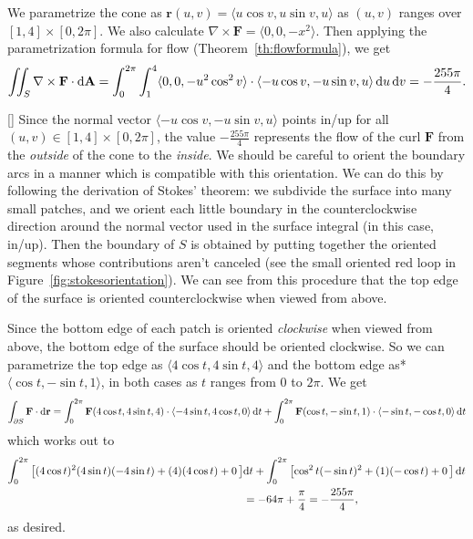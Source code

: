 \documentclass[prettycode,shellescape]{watsonbook}
\begin{document}
\begin{solution}
  We parametrize the cone as
  $\mathbf{r}(u,v) = \langle u\cos v, u\sin v, u \rangle$ as $(u,v)$
  ranges over $[1,4]\times [0,2\pi]$.  We also calculate
  $\nabla \times \mathbf{F} = \langle 0, 0, -x^2 \rangle$. Then applying
  the parametrization formula for flow (Theorem~\ref{th:flowformula}),
  we get 
  \[
    \iint_S \nabla \times \mathbf{F} \cdot \mathrm{d}\mathbf{A} =
    \int_{0}^{2\pi} \int_{1}^{4} \langle 0, 0, -u^2\cos^2 v \rangle \cdot
    \langle -u  \cos v, -u \sin v, u \rangle \, \mathrm{d} u\, \mathrm{d} v = -
    \frac{255\pi}{4}. 
  \]
  \begin{insetfigure}{\usebox{\asybox}}[]
Since the normal vector
    $\langle -u \cos v, -u \sin v, u \rangle$ points in/up for all
    $(u,v) \in [1,4]\times [0,2\pi]$, the value $- \frac{255\pi}{4}$
    represents the flow of the curl $\mathbf{F}$ from the
    \textit{outside} of the cone to the \textit{inside}. We should be
    careful to orient the boundary arcs in a manner which is
    compatible with this orientation. We can do this by following the
    derivation of Stokes' theorem: we subdivide the surface into many
    small patches, and we orient each little boundary in the
    counterclockwise direction around the normal vector used in the
    surface integral (in this case, in/up). Then the boundary of $S$
    is obtained by putting together the oriented segments whose
    contributions aren't canceled (see the small oriented red loop in
    Figure~\ref{fig:stokesorientation}). We can see from this
    procedure that the top edge of the surface is oriented
    counterclockwise when viewed from
    above. 
  \end{insetfigure}

  Since the bottom edge of each patch is oriented \textit{clockwise}
  when viewed from above, the bottom edge of the surface should be
  oriented clockwise. So we can parametrize the top edge as
  $\langle 4 \cos t, 4 \sin t, 4 \rangle$ and the bottom edge as*
   $\langle\cos t, - \sin t, 1\rangle$, in both
  cases as $t$ ranges from $0$ to $2\pi$. We get
  \[
    \int_{\partial S} \mathbf{F} \cdot \mathrm{d}{\mathbf{r}} =
    \int_{0}^{2\pi} \mathbf{F}(4\cos t, 4\sin t, 4) \cdot \langle
    -4\sin t, 4 \cos t, 0 \rangle \, \mathrm{d}{t} +
    \int_{0}^{2\pi} \mathbf{F}(\cos t, -\sin t, 1) \cdot \langle
    -\sin t, -\cos t, 0 \rangle \, \mathrm{d}{t}
  \]
  which works out to
  \begin{align*}
    \int_{0}^{2\pi} \left[(4\cos t)^2 (4\sin t)(-4\sin t) + (4)(4\cos t) +
    0 \, \right] &\mathrm{d} t  + \int_{0}^{2\pi}\left[ \cos^2 t (-\sin t)^2 + (1)(-\cos t) +
                   0\, \right]\mathrm{d} t \\ &= -64\pi + \frac{\pi}{4} = -
                                        \frac{255\pi}{4}, 
  \end{align*}
  as desired. 
\end{solution}
\end{document}

